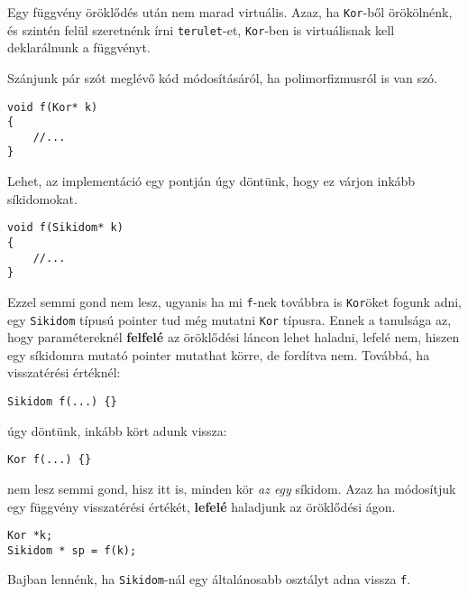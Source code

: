 \documentclass[a4paper,11.5pt]{article}
\begin{document}
%
%
	\begin{note}
		Egy függvény öröklődés után nem marad virtuális. Azaz, ha \texttt{Kor}-ből örökölnénk, és szintén felül szeretnénk írni \texttt{terulet}-et, \texttt{Kor}-ben is virtuálisnak kell deklarálnunk a függvényt.
	\end{note}
	
	\smallskip
	Szánjunk pár szót meglévő kód módosításáról, ha polimorfizmusról is van szó.
	\begin{lstlisting}
void f(Kor* k)
{
	//...
}
	\end{lstlisting}
	Lehet, az implementáció egy pontján úgy döntünk, hogy ez várjon inkább síkidomokat.
	\begin{lstlisting}
void f(Sikidom* k)
{
	//...
}
	\end{lstlisting}
	Ezzel semmi gond nem lesz, ugyanis ha mi \texttt{f}-nek továbbra is \texttt{Kor}öket fogunk adni, egy \texttt{Sikidom} típusú pointer tud még mutatni \texttt{Kor} típusra. Ennek a tanulsága az, hogy paramétereknél \textbf{felfelé} az öröklődési láncon lehet haladni, lefelé nem, hiszen egy síkidomra mutató pointer mutathat körre, de fordítva nem. Továbbá, ha visszatérési értéknél:
	\begin{lstlisting}
Sikidom f(...) {}
	\end{lstlisting}
	úgy döntünk, inkább kört adunk vissza:
	\begin{lstlisting}
Kor f(...) {}
	\end{lstlisting}
	nem lesz semmi gond, hisz itt is, minden kör \textit{az egy} síkidom. Azaz ha módosítjuk egy függvény visszatérési értékét, \textbf{lefelé} haladjunk az öröklődési ágon.
	\begin{lstlisting}
Kor *k;
Sikidom * sp = f(k);
	\end{lstlisting}
	Bajban lennénk, ha \texttt{Sikidom}-nál egy általánosabb osztályt adna vissza \texttt{f}.
	\medskip
	
\end{document}
